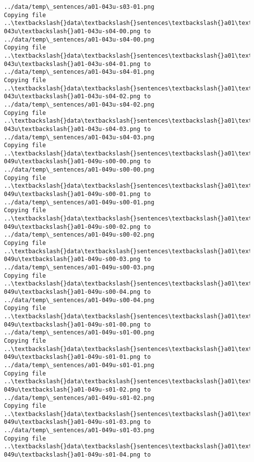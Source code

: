 \documentclass[11pt]{article}
\begin{document}
\begin{Verbatim}[commandchars=\\\{\}]
../data/temp\_sentences/a01-043u-s03-01.png
Copying file ..\textbackslash{}data\textbackslash{}sentences\textbackslash{}a01\textbackslash{}a01-043u\textbackslash{}a01-043u-s04-00.png to
../data/temp\_sentences/a01-043u-s04-00.png
Copying file ..\textbackslash{}data\textbackslash{}sentences\textbackslash{}a01\textbackslash{}a01-043u\textbackslash{}a01-043u-s04-01.png to
../data/temp\_sentences/a01-043u-s04-01.png
Copying file ..\textbackslash{}data\textbackslash{}sentences\textbackslash{}a01\textbackslash{}a01-043u\textbackslash{}a01-043u-s04-02.png to
../data/temp\_sentences/a01-043u-s04-02.png
Copying file ..\textbackslash{}data\textbackslash{}sentences\textbackslash{}a01\textbackslash{}a01-043u\textbackslash{}a01-043u-s04-03.png to
../data/temp\_sentences/a01-043u-s04-03.png
Copying file ..\textbackslash{}data\textbackslash{}sentences\textbackslash{}a01\textbackslash{}a01-049u\textbackslash{}a01-049u-s00-00.png to
../data/temp\_sentences/a01-049u-s00-00.png
Copying file ..\textbackslash{}data\textbackslash{}sentences\textbackslash{}a01\textbackslash{}a01-049u\textbackslash{}a01-049u-s00-01.png to
../data/temp\_sentences/a01-049u-s00-01.png
Copying file ..\textbackslash{}data\textbackslash{}sentences\textbackslash{}a01\textbackslash{}a01-049u\textbackslash{}a01-049u-s00-02.png to
../data/temp\_sentences/a01-049u-s00-02.png
Copying file ..\textbackslash{}data\textbackslash{}sentences\textbackslash{}a01\textbackslash{}a01-049u\textbackslash{}a01-049u-s00-03.png to
../data/temp\_sentences/a01-049u-s00-03.png
Copying file ..\textbackslash{}data\textbackslash{}sentences\textbackslash{}a01\textbackslash{}a01-049u\textbackslash{}a01-049u-s00-04.png to
../data/temp\_sentences/a01-049u-s00-04.png
Copying file ..\textbackslash{}data\textbackslash{}sentences\textbackslash{}a01\textbackslash{}a01-049u\textbackslash{}a01-049u-s01-00.png to
../data/temp\_sentences/a01-049u-s01-00.png
Copying file ..\textbackslash{}data\textbackslash{}sentences\textbackslash{}a01\textbackslash{}a01-049u\textbackslash{}a01-049u-s01-01.png to
../data/temp\_sentences/a01-049u-s01-01.png
Copying file ..\textbackslash{}data\textbackslash{}sentences\textbackslash{}a01\textbackslash{}a01-049u\textbackslash{}a01-049u-s01-02.png to
../data/temp\_sentences/a01-049u-s01-02.png
Copying file ..\textbackslash{}data\textbackslash{}sentences\textbackslash{}a01\textbackslash{}a01-049u\textbackslash{}a01-049u-s01-03.png to
../data/temp\_sentences/a01-049u-s01-03.png
Copying file ..\textbackslash{}data\textbackslash{}sentences\textbackslash{}a01\textbackslash{}a01-049u\textbackslash{}a01-049u-s01-04.png to

\end{Verbatim}
\end{document}
